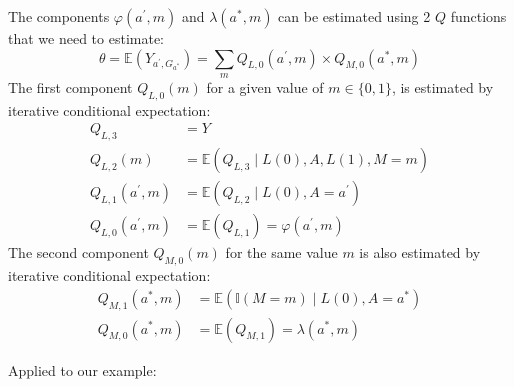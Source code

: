 \documentclass[
]{book}
\begin{document}
The components \(\varphi(a^\prime,m)\) and \(\lambda(a^*,m)\) can be estimated using 2 \(Q\) functions that we need to estimate:
\begin{equation*}
  \theta = \mathbb{E}\left(Y_{a^\prime,G_{a^*}} \right) = \sum_{m} Q_{L,0}(a^\prime,m) \times Q_{M,0}(a^*,m)
\end{equation*}
The first component \(Q_{L,0}(m)\) for a given value of \(m\in \{0,1\}\), is estimated by iterative conditional expectation:
\begin{align*}
  Q_{L,3} &= Y \\
  Q_{L,2}(m) &= \mathbb{E}\left(Q_{L,3} \mid L(0),A,L(1),M=m\right) \\
  Q_{L,1}(a^\prime,m) &= \mathbb{E}\left(Q_{L,2} \mid L(0),A=a^\prime\right) \\
  Q_{L,0}(a^\prime,m) &= \mathbb{E}\left(Q_{L,1}\right) = \varphi(a^\prime,m)
\end{align*}
The second component \(Q_{M,0}(m)\) for the same value \(m\) is also estimated by iterative conditional expectation:
\begin{align*}
  Q_{M,1}(a^*,m) &= \mathbb{E}\left(\mathbb{I}(M=m) \mid L(0), A=a^* \right) \\
  Q_{M,0}(a^*,m) &= \mathbb{E}\left(Q_{M,1}\right) = \lambda(a^*,m)
\end{align*}

Applied to our example:
\end{document}
